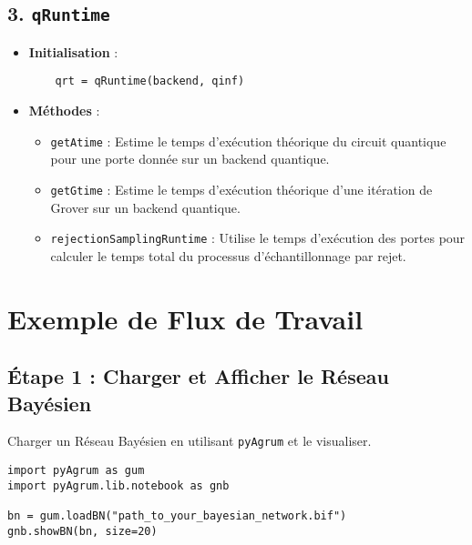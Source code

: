 \subsection*{3. \texttt{qRuntime}}
\begin{itemize}
    \item \textbf{Initialisation} : 
    \begin{minipage}{\linewidth}
    \begin{lstlisting}
    qrt = qRuntime(backend, qinf)
    \end{lstlisting}
    \end{minipage}
    

    \item \textbf{Méthodes} :
    \begin{itemize}
        \item \texttt{getAtime} : Estime le temps d'exécution théorique du circuit quantique pour une porte donnée sur un backend quantique.
        \item \texttt{getGtime} : Estime le temps d'exécution théorique d'une itération de Grover sur un backend quantique.
        \item \texttt{rejectionSamplingRuntime} : Utilise le temps d'exécution des portes pour calculer le temps total du processus d'échantillonnage par rejet.
    \end{itemize}
\end{itemize}



\section*{Exemple de Flux de Travail}

\subsection*{Étape 1 : Charger et Afficher le Réseau Bayésien}
Charger un Réseau Bayésien en utilisant \texttt{pyAgrum} et le visualiser.
\begin{verbatim}
import pyAgrum as gum
import pyAgrum.lib.notebook as gnb

bn = gum.loadBN("path_to_your_bayesian_network.bif") 
gnb.showBN(bn, size=20)
\end{verbatim}

